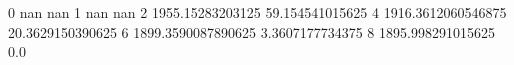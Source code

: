 0 nan nan
1 nan nan
2 1955.15283203125 59.154541015625
4 1916.3612060546875 20.3629150390625
6 1899.3590087890625 3.3607177734375
8 1895.998291015625 0.0
